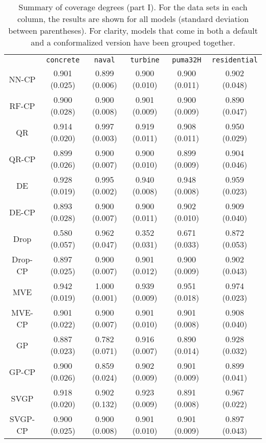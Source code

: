 \documentclass[smallcondensed]{svjour3}
\begin{document}
\begin{appendices}
    \begin{table}[ht!]
        \scriptsize
        \centering
        \renewcommand{\arraystretch}{1.5}
        \begin{tabular}{c||c|c|c|c|c}
            &\texttt{concrete}&\texttt{naval}&\texttt{turbine}&\texttt{puma32H}&\texttt{residential}\\
            \hhline{======}
            NN-CP&0.901 (0.025)&0.899 (0.006)&0.900 (0.010)&0.900 (0.011)&0.902 (0.048)\\
            \hdashline
            RF-CP&0.900 (0.028)&0.900 (0.008)&0.901 (0.009)&0.900 (0.009)&0.890 (0.047)\\
            \hdashline
            QR&0.914 (0.020)&0.997 (0.003)&0.919 (0.011)&0.908 (0.011)&0.950 (0.029)\\
            QR-CP&0.899 (0.026)&0.900 (0.007)&0.900 (0.010)&0.899 (0.009)&0.904 (0.046)\\
            \hdashline
            DE&0.928 (0.019)&0.995 (0.002)&0.940 (0.008)&0.948 (0.008)&0.959 (0.023)\\
            DE-CP&0.893 (0.028)&0.900 (0.007)&0.900 (0.011)&0.902 (0.010)&0.909 (0.040)\\
            \hdashline
            Drop&0.580 (0.057)&0.962 (0.047)&0.352 (0.031)&0.671 (0.033)&0.872 (0.053)\\
            Drop-CP&0.897 (0.025)&0.900 (0.007)&0.901 (0.012)&0.900 (0.009)&0.902 (0.043)\\
            \hdashline
            MVE&0.942 (0.019)&1.000 (0.001)&0.939 (0.009)&0.951 (0.018)&0.974 (0.023)\\
            MVE-CP&0.901 (0.022)&0.900 (0.007)&0.901 (0.010)&0.901 (0.008)&0.908 (0.040)\\
            \hdashline
            GP&0.887 (0.023)&0.782 (0.071)&0.916 (0.007)&0.890 (0.014)&0.928 (0.032)\\
            GP-CP&0.900 (0.026)&0.859 (0.024)&0.902 (0.009)&0.901 (0.009)&0.899 (0.041)\\
            \hdashline
            SVGP&0.918 (0.020)&0.902 (0.132)&0.923 (0.009)&0.891 (0.008)&0.967 (0.022)\\
            SVGP-CP&0.900 (0.025)&0.900 (0.008)&0.901 (0.010)&0.901 (0.009)&0.897 (0.043)\\
        \end{tabular}
        \caption{Summary of coverage degrees (part I). For the data sets in each column, the results are shown for all models (standard deviation between parentheses). For clarity, models that come in both a default and a conformalized version have been grouped together.}
        \label{table:coverage}
    \end{table}


\end{appendices}
\end{document}
